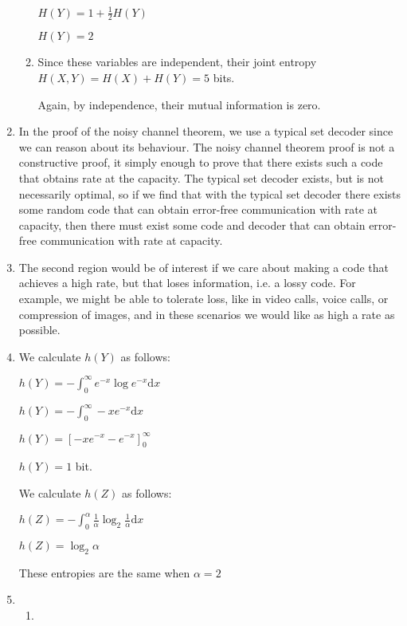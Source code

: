 \begin{enumerate}
\begin{enumerate}
            $H(Y) = 1 + \frac{1}{2}H(Y)$

            $H(Y) = 2$

            \item
              Since these variables are independent, their joint entropy $H(X,Y) = H(X) + H(Y) = 5$ bits.

              Again, by independence, their mutual information is zero.
      \end{enumerate}

      \item

        In the proof of the noisy channel theorem, we use a typical set decoder since we can reason about its behaviour. The noisy channel theorem proof is not a constructive proof, it simply enough to prove that there exists such a code that obtains rate at the capacity. The typical set decoder exists, but is not necessarily optimal, so if we find that with the typical set decoder there exists some random code that can obtain error-free communication with rate at capacity, then there must exist some code and decoder that can obtain error-free communication with rate at capacity.


        \item
          The second region would be of interest if we care about making a code that achieves a high rate, but that loses information, i.e. a lossy code. For example, we might be able to tolerate loss, like in video calls, voice calls, or compression of images, and in these scenarios we would like as high a rate as possible.

          \item
            We calculate $h(Y)$ as follows:

            $h(Y) = -\int_0^\infty e^{-x}\log e^{-x} \mathrm{d}x$

            $h(Y) = -\int_0^\infty -xe^{-x}\mathrm{d}x$

            $h(Y) = [-xe^{-x} -e^{-x}]^\infty_0$

            $h(Y) = 1$ bit.


            We calculate $h(Z)$ as follows:

            $h(Z) = -\int_0^\alpha \frac{1}{\alpha}\log_2 \frac{1}{\alpha} \mathrm{d}x$

            $h(Z) =  \log_2 \alpha$

            These entropies are the same when $\alpha = 2$

            \item
              \begin{enumerate}
                  \item


\end{enumerate}
\end{enumerate}
